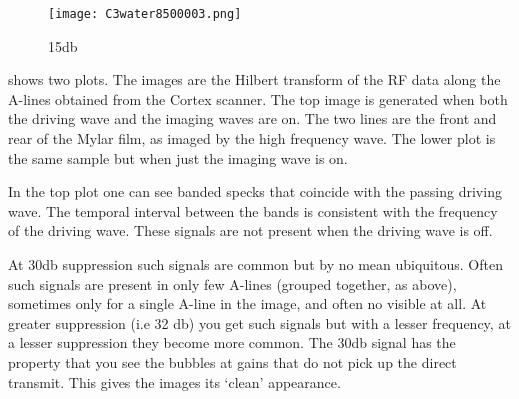 \begin{figure}[h]
     \centering
          \texttt{[image: C3water8500003.png]}
     \caption{15db}
   \label{fig:water_cavitation_85}
\end{figure}


 shows two plots.
The images are the Hilbert transform of the RF data along the A-lines obtained from the Cortex scanner.
%
The top image is generated when both the driving wave and the imaging waves are on.
The two lines are the front and rear of the Mylar film, as imaged by the high frequency wave.
The lower plot is the same sample but when just the imaging wave is on.


In the top plot one can see banded specks that coincide  with the passing  driving wave.  
The temporal interval between the bands is consistent with the frequency of the driving wave.
These signals are not present when the driving wave is off. %

At 30db suppression  such signals are  common but by no mean ubiquitous.
Often such signals are present in only  few A-lines (grouped together, as above), sometimes only for a single A-line in the image, and often no visible at all.
At greater suppression (i.e 32 db) you get such signals but with a lesser frequency,
at a lesser suppression they become more common.
The 30db signal has the property that you see  the bubbles at gains that  do not pick up the direct transmit.
This gives the images its `clean' appearance.




